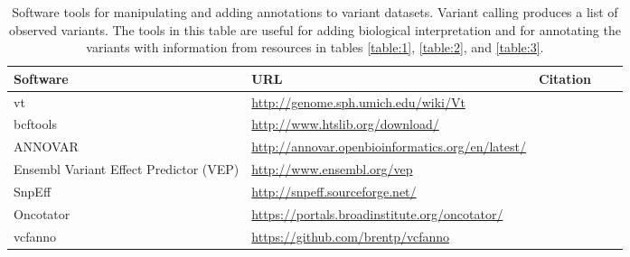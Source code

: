 \documentclass{article}
\begin{document}
 
\begin{table}[p]
  \footnotesize
\centering
\begin{tabularx}{\textwidth}{p{2.5cm}XXp{1.5cm}p{1.5cm}}
  \hline
  Software & URL & Citation \\
  \hline
  vt & \url{http://genome.sph.umich.edu/wiki/Vt} & \parencite{Tan2015-dv} \\
  bcftools & \url{http://www.htslib.org/download/} & \parencite{Li2009-du} \\
  ANNOVAR & \url{http://annovar.openbioinformatics.org/en/latest/} & \parencite{Wang2010-bt} \\
  Ensembl Variant Effect Predictor (VEP) & \url{http://www.ensembl.org/vep} & \parencite{McLaren2016-br} \\
  SnpEff & \url{http://snpeff.sourceforge.net/} & \parencite{Cingolani2012-pt} \\
  Oncotator & \url{https://portals.broadinstitute.org/oncotator/} &
  \parencite{Ramos2015-vn} \\
  vcfanno & \url{https://github.com/brentp/vcfanno} &
  \parencite{Pedersen2016-pu} \\
  \hline
\end{tabularx}
\caption{Software tools for manipulating and adding annotations to
  variant datasets. Variant calling produces a list of observed variants. The
  tools in this table are useful for adding biological interpretation
  and for annotating the variants with information from resources in
  tables \ref{table:1}, \ref{table:2}, and \ref{table:3}.} 
\label{table:4}
\end{table}
\end{document}
